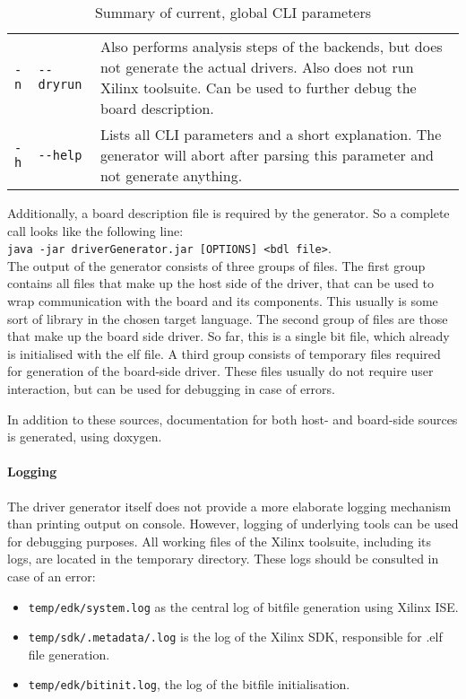\documentclass{report}
\begin{document}
\begin{table}
\begin{tabular}{ l p{2cm} | p{9cm} }
\verb!-n! & \verb!--dryrun! & Also performs analysis steps of the backends, but does not generate the actual drivers. Also does not run Xilinx toolsuite. Can be used to further debug the board description.\\
\verb!-h! & \verb!--help! & Lists all CLI parameters and a short explanation. The generator will abort after parsing this parameter and not generate anything.\\ \hline
\end{tabular}
\caption{Summary of current, global CLI parameters}
\label{tab:cliParams}
\end{table}

Additionally, a board description file is required by the generator. So a complete call looks like the following line:\\

\texttt{java -jar driverGenerator.jar [OPTIONS] <bdl file>}.\\

The output of the generator consists of three groups of files. The first group contains all files that make up the host side of the driver, that can be used to wrap communication with the board and its components. This usually is some sort of library in the chosen target language.
The second group of files are those that make up the board side driver. So far, this is a single bit file, which already is initialised with the elf file.
A third group consists of temporary files required for generation of the board-side driver. These files usually do not require user interaction, but can be used for debugging in case of errors.

In addition to these sources, documentation for both host- and board-side sources is generated, using doxygen.

\paragraph{Logging}
The driver generator itself does not provide a more elaborate logging mechanism than printing output on console. However, logging of underlying tools can be used for debugging purposes. All working files of the Xilinx toolsuite, including its logs, are located in the temporary directory. These logs should be consulted in case of an error:
\begin{itemize} \itemsep1pt \parskip0pt 
\item \texttt{temp/edk/system.log} as the central log of bitfile generation using Xilinx ISE.
\item \texttt{temp/sdk/.metadata/.log} is the log of the Xilinx SDK, responsible for .elf file generation.
\item \texttt{temp/edk/bitinit.log}, the log of the bitfile initialisation.
\end{itemize}
\end{document}
